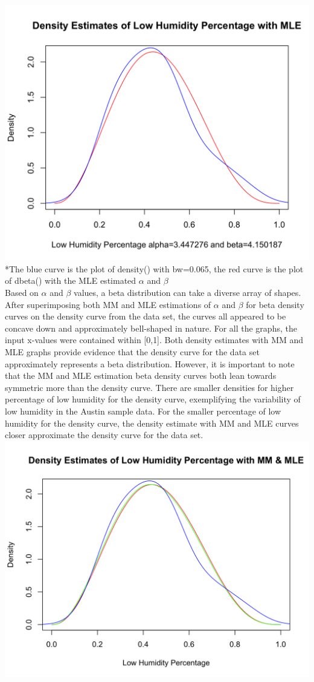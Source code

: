 \documentclass[12pt, letterpaper]{article}
\begin{document}
\includegraphics[scale=0.40]{austinweather_mle.png}
\footnotesize
\\\**The blue curve is the plot of density() with bw=0.065, the red curve is the plot of dbeta() with the MLE estimated ${\alpha}$ and ${\beta}$ \\
\normalsize 
Based on ${\alpha}$ and ${\beta}$ values, a beta distribution can take a diverse array of shapes. After superimposing both MM and MLE estimations of ${\alpha}$ and ${\beta}$ for beta density curves on the density curve from the data set, the curves all appeared to be concave down and approximately bell-shaped in nature. For all the graphs, the input x-values were contained within [0,1]. Both density estimates with MM and MLE graphs provide evidence that the density curve for the data set approximately represents a beta distribution. However, it is important to note that the MM and MLE estimation beta density curves both lean towards symmetric more than the density curve. There are smaller densities for higher percentage of low humidity for the density curve, exemplifying the variability of low humidity in the Austin sample data. For the smaller percentage of low humidity for the density curve, the density estimate with MM and MLE curves closer approximate the density curve for the data set. 
\includegraphics[scale=0.40]{austinweather_mmmle.png}
\end{document}
